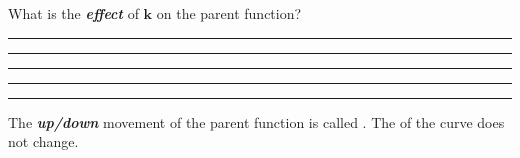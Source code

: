What is the {\bfseries\itshape effect} of $\bm{k}$ on the parent function?

\rule{\textwidth}{0.15mm}

\rule{\textwidth}{0.15mm}

\rule{\textwidth}{0.15mm}

\rule{\textwidth}{0.15mm}

\rule{\textwidth}{0.15mm}

\vfill 

The {\bfseries\itshape up/down} movement of the parent function is called 
 . 
The  of the curve does not change.